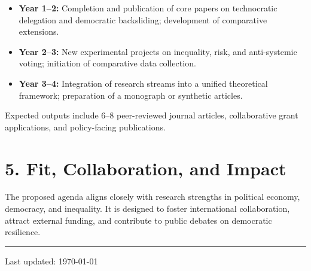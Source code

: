 \documentclass[letterpaper,11pt]{article}
\begin{document}
\begin{itemize}
  \item \textbf{Year 1--2:} Completion and publication of core papers on technocratic delegation and democratic backsliding; development of comparative extensions.
  \item \textbf{Year 2--3:} New experimental projects on inequality, risk, and anti-systemic voting; initiation of comparative data collection.
  \item \textbf{Year 3--4:} Integration of research streams into a unified theoretical framework; preparation of a monograph or synthetic articles.
\end{itemize}

Expected outputs include 6--8 peer-reviewed journal articles, collaborative grant applications, and policy-facing publications.

\section*{5. Fit, Collaboration, and Impact}

The proposed agenda aligns closely with research strengths in political economy, democracy, and inequality. It is designed to foster international collaboration, attract external funding, and contribute to public debates on democratic resilience.

\vspace{0.3cm}
\noindent\rule[0.5ex]{\linewidth}{0.4pt}

{\small Last updated: \today}
\end{document}

